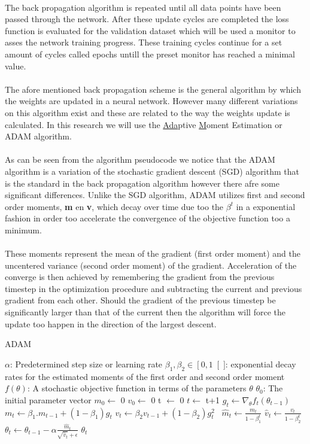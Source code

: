 \documentclass[]{article}
\begin{document}
\\ 
The back propagation algorithm is repeated until all data points have been passed through the network. After these update cycles are completed the loss function is evaluated for the validation dataset which will be used a monitor to asses the network training progress. These training cycles continue for a set amount of cycles called epochs untill the preset monitor has reached a minimal value.
\\
\\   
The afore mentioned back propagation scheme is the general algorithm by which the weights are updated in a neural network. However many different variations on this algorithm exist and these are related to the way the weights update is calculated. In this research we will use the \underline{Ada}ptive \underline{M}oment Estimation or ADAM algorithm.
\\
\\
As can be seen from the algorithm pseudocode we notice that the ADAM algorithm is a variation of the stochastic gradient descent (SGD) algorithm that is the standard in the back propagation algorithm however there afre some significant differences. Unlike the SGD algorithm, ADAM utilizes first and second order moments, \textbf{m} en \textbf{v}, which decay over time due too the $\beta^t$ in a exponential fashion in order too accelerate the convergence of the objective function too a minimum. 
\\
\\
These moments represent the mean of the gradient (first order moment) and the uncentered variance (second order moment) of the gradient. Acceleration of the converge is then achieved by remembering the gradient from the previous timestep in the optimization procedure and subtracting the current and previous gradient from each other. Should the gradient of the previous timestep be significantly larger than that of the current then the algorithm will force the update too happen in the direction of the largest descent. 
\begin{algorithm}
	\caption{ADAM}
	\begin{algorithmic}[1]
		\Require $\alpha$: Predetermined step size or learning rate
		\Require $\beta_1, \beta_2 \in \left[0,1\right[]$: exponential decay rates for the estimated moments of the first order and second order moment
		\Require $f(\theta)$: A stochastic objective function in terms of the parameters $\theta$ 
		\Require $\theta_0$: The initial parameter vector
		\State $m_0 \leftarrow$ 0  
		\State $v_0 \leftarrow$ 0 
		\State t $\leftarrow$ 0 
		\State $t \leftarrow$ t+1
		\State $g_t \leftarrow \nabla_{\theta}f_t(\theta_{t-1})$ 
		\State $m_t \leftarrow \beta_1.m_{t-1}+(1-\beta_1)g_t$ 
		\State $v_t \leftarrow \beta_2 v_{t-1}+ (1-\beta_2)g_t^2$ \
		\State $\hat{m}_t \leftarrow \frac{m_t}{1-\beta_1^t}$ 
		\State $\hat{v}_t \leftarrow \frac{v_t}{1-\beta_2^t}$ 
		\State $\theta_t \leftarrow \theta_{t-1}-\alpha \frac{\hat{m}_t}{\sqrt{\hat{v}_t}+\epsilon} $ 
		\EndWhile
		\State \Return $\theta_t$
	\end{algorithmic}
\end{algorithm}  
\clearpage
\newpage
\end{document}
